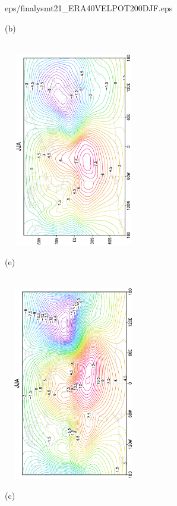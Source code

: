 \documentclass[12pt,a4paper,twoside,openright,headinclude,liststotoc,bibtotoc]{scrreprt}
\begin{document}
\begin{figure}[H]
{{eps/finalysmt21_ERA40VELPOT200DJF.eps}
}
\parbox{8.5cm}{\hspace{0.50cm}\begin{scriptsize}(b)\end{scriptsize} \vspace{-0.8cm} \\
\includegraphics[height=8.5cm,width=6.1cm,angle=-90]
{eps/finalysmvelopot149_200JJA.eps}
}
\parbox{8.5cm}{\hspace{0.25cm}\begin{scriptsize}(e)\end{scriptsize} \vspace{-0.8cm} \\
\includegraphics[height=8.5cm,width=6.1cm,angle=-90]
{eps/finalysmt21_ERA40VELPOT200JJA.eps}
}
\parbox{8.5cm}{\hspace{0.50cm}\begin{scriptsize}(c)\end{scriptsize} \vspace{-0.8cm} \\
}
\end{figure}
\end{document}
